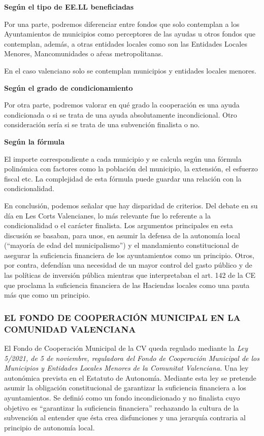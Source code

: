 \documentclass[
]{article}
\begin{document}
\textbf{Según el tipo de EE.LL beneficiadas}

Por una parte, podremos diferenciar entre fondos que solo contemplan a
los Ayuntamientos de municipios como perceptores de las ayudas u otros
fondos que contemplan, además, a otras entidades locales como son las
Entidades Locales Menores, Mancomunidades o aŕeas metropolitanas.

En el caso valenciano solo se contemplan municipios y entidades locales
menores.

\textbf{Según el grado de condicionamiento}

Por otra parte, podremos valorar en qué grado la cooperación es una
ayuda condicionada o si se trata de una ayuda absolutamente
incondicional. Otro consideración sería si se trata de una subvención
finalista o no.

\textbf{Según la fórmula}

El importe correspondiente a cada municipio y se calcula según una
fórmula polinómica con factores como la población del municipio, la
extensión, el esfuerzo fiscal etc. La complejidad de esta fórmula puede
guardar una relación con la condicionalidad.

En conclusión, podemos señalar que hay disparidad de criterios. Del
debate en su día en Les Corts Valencianes, lo más relevante fue lo
referente a la condicionalidad o el carácter finalista. Los argumentos
principales en esta discusión se basaban, para unos, en asumir la
defensa de la autonomía local (``mayoría de edad del municipalismo'') y
el mandamiento constitucional de asegurar la suficiencia financiera de
los ayuntamientos como un principio. Otros, por contra, defendían una
necesidad de un mayor control del gasto público y de las políticas de
inversión pública mientras que interpretaban el art. 142 de la CE que
proclama la suficiencia financiera de las Haciendas locales como una
pauta más que como un principio.

\hypertarget{el-fondo-de-cooperaciuxf3n-municipal-en-la-comunidad-valenciana}{%
\subsubsection{EL FONDO DE COOPERACIÓN MUNICIPAL EN LA COMUNIDAD
VALENCIANA}\label{el-fondo-de-cooperaciuxf3n-municipal-en-la-comunidad-valenciana}}

El Fondo de Cooperación Municipal de la CV queda regulado mediante la
\emph{Ley 5/2021, de 5 de noviembre, reguladora del Fondo de Cooperación
Municipal de los Municipios y Entidades Locales Menores de la Comunitat
Valenciana.} Una ley autonómica prevista en el Estatuto de Autonomía.
Mediante esta ley se pretende asumir la obligación constitucional de
garantizar la suficiencia financiera a los ayuntamientos. Se definió
como un fondo incondicionado y no finalista cuyo objetivo es
``garantizar la suficiencia financiera'' rechazando la cultura de la
subvención al entender que ésta crea disfunciones y una jerarquía
contraria al principio de autonomía local.
\end{document}

